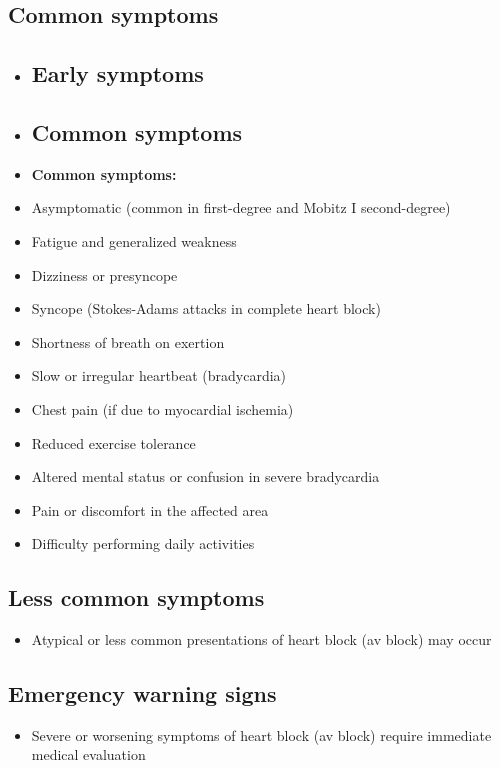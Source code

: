 \subsection{Common symptoms}
\begin{itemize}[noitemsep]
  \item \subsection{Early symptoms}
  \item \subsection{Common symptoms}
  \item \textbf{Common symptoms:}
  \item Asymptomatic (common in first-degree and Mobitz I second-degree)
  \item Fatigue and generalized weakness
  \item Dizziness or presyncope
  \item Syncope (Stokes-Adams attacks in complete heart block)
  \item Shortness of breath on exertion
  \item Slow or irregular heartbeat (bradycardia)
  \item Chest pain (if due to myocardial ischemia)
  \item Reduced exercise tolerance
  \item Altered mental status or confusion in severe bradycardia
  \item Pain or discomfort in the affected area
  \item Difficulty performing daily activities
\end{itemize}

\subsection{Less common symptoms}
\begin{itemize}[noitemsep]
  \item Atypical or less common presentations of heart block (av block) may occur
\end{itemize}

\subsection{Emergency warning signs}
\begin{itemize}[noitemsep]
  \item Severe or worsening symptoms of heart block (av block) require immediate medical evaluation
\end{itemize}
